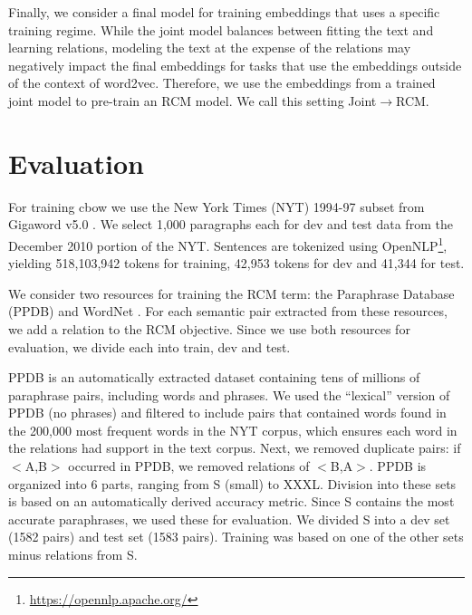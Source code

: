 \documentclass[11pt]{article}
\begin{document}
Finally, we consider a final model for training embeddings that uses a specific training regime.
While the joint model balances between fitting the text and learning relations, modeling 
the text at the expense of the relations may negatively impact the final embeddings for tasks that use
the embeddings outside of the context of word2vec.
Therefore, we use the embeddings from a trained joint model to pre-train an RCM model.
We call this setting Joint$\rightarrow$RCM.

\section{Evaluation}
For training cbow we use the New York Times (NYT) 1994-97 subset from Gigaword v5.0 \cite{Parker:2011lr}.
We select 1,000 paragraphs each for dev and test data from 
the December 2010 portion of the NYT.
Sentences are tokenized using OpenNLP\footnote{\url{https://opennlp.apache.org/}}, yielding 
518,103,942 tokens for training, 42,953 tokens for dev and 41,344 for test.

We consider two resources for training the RCM term:
the Paraphrase Database (PPDB) \cite{ganitkevitch2013ppdb} and
WordNet \cite{fellbaum1999wordnet}. For each semantic pair extracted from these
resources, we add a relation to the RCM objective. Since we use both resources 
for evaluation, we divide each into train, dev and test.

PPDB is an automatically extracted dataset containing tens of millions of paraphrase pairs, including words and phrases.
We used the ``lexical'' version of PPDB (no phrases) and filtered to include pairs that 
contained words found in the 200,000 most frequent
words in the NYT corpus, which ensures each word in the relations had support in the text corpus.
Next, we removed duplicate pairs: if $<$A,B$>$ occurred in PPDB, we removed relations of $<$B,A$>$.
PPDB is organized into 6 parts, ranging from S (small) to XXXL. Division into these sets is based on an automatically
derived accuracy metric. Since S contains the most accurate paraphrases, we used these for evaluation.
We divided S into a dev set (1582 pairs) and test set (1583 pairs). Training was based on one of the other sets minus relations
from S.
\end{document}
